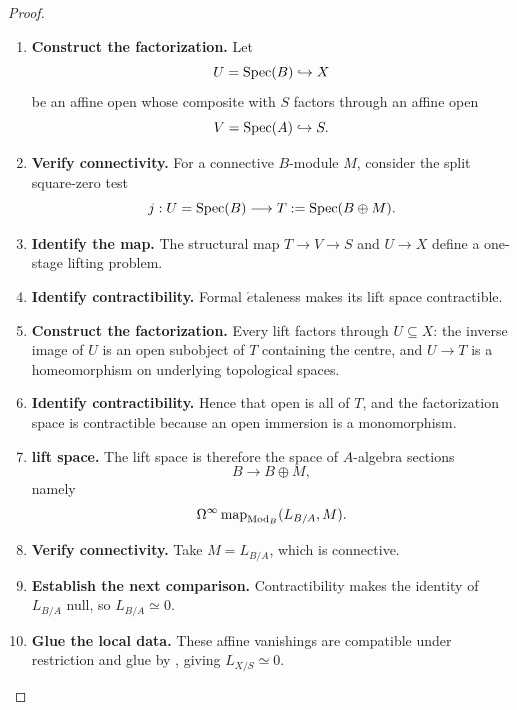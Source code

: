 \begin{proof}
\begin{enumerate}[label=\textup{(\arabic*)}]
    \item \textbf{Construct the factorization.}
    Let
    \[
            U=\operatorname{Spec}(B)\hookrightarrow X
        \]
    be an affine open whose composite with \(S\) factors through an affine open
    \[
            V=\operatorname{Spec}(A)\hookrightarrow S.
        \]

    \item \textbf{Verify connectivity.}
    For a connective \(B\)-module \(M\), consider the split square-zero test
    \[
            j:U=\operatorname{Spec}(B)\longrightarrow T:=\operatorname{Spec}(B\oplus M).
        \]

    \item \textbf{Identify the map.}
    The structural map \(T\to V\to S\) and \(U\to X\) define a one-stage lifting problem.

    \item \textbf{Identify contractibility.}
    Formal \(\acute{e}\)taleness makes its lift space contractible.

    \item \textbf{Construct the factorization.}
    Every lift factors through \(U\subseteq X\): the inverse image of \(U\) is an open
    subobject of \(T\) containing the centre, and \(U\to T\) is a homeomorphism on
    underlying topological spaces.

    \item \textbf{Identify contractibility.}
    Hence that open is all of \(T\), and the factorization space is contractible because
    an open immersion is a monomorphism.

    \item \textbf{lift space.}
    The lift space is therefore the space of \(A\)-algebra sections
    \[
            B\longrightarrow B\oplus M,
        \]
    namely
    \[
            \Omega^\infty\operatorname{map}_{\operatorname{Mod}_B}(L_{B/A},M).
        \]

    \item \textbf{Verify connectivity.}
    Take \(M=L_{B/A}\), which is connective.

    \item \textbf{Establish the next comparison.}
    Contractibility makes the identity of \(L_{B/A}\) null, so \(L_{B/A}\simeq0\).

    \item \textbf{Glue the local data.}
    These affine vanishings are compatible under restriction and glue by
    , giving \(L_{X/S}\simeq0\).
\end{enumerate}
\end{proof}

